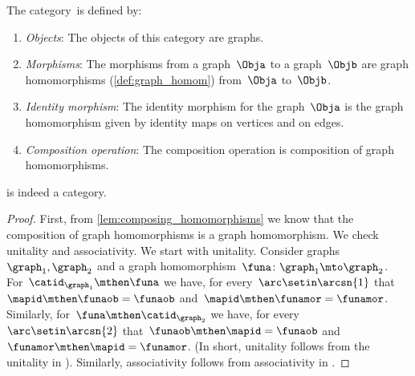 \begin{ctdefinition}
    \label{def:Grph}
    The category~\Grph is defined by:
    \begin{enumerate}
        \item \emph{Objects}: The objects of this category are graphs.
        \item \emph{Morphisms}: The morphisms from a graph~$\Obja$ to a graph~$\Objb$ are graph homomorphisms (\cref{def:graph_homom}) from~$\Obja$ to~$\Objb$.
        \item \emph{Identity morphism}: The identity morphism for the graph~$\Obja$
              is the graph homomorphism given by identity maps on vertices and on edges.
        \item \emph{Composition operation}: The composition operation is composition of graph homomorphisms.
    \end{enumerate}
\end{ctdefinition}

\begin{lemma}
    \Grph is indeed a category.
\end{lemma}

\begin{proof}
    First, from \cref{lem:composing_homomorphisms} we know that the composition of graph homomorphisms is a graph homomorphism.
    We check unitality and associativity.
    We start with unitality.
    Consider graphs~$\graph_1,\graph_2$ and a graph homomorphism~$\funa\colon \graph_1\mto \graph_2$.
    For~$\catid_{\graph_1}\mthen \funa$ we have, for every~$\arc \setin \arcsn{1}$ that~$\mapid\mthen \funaob=\funaob$ and~$\mapid\mthen \funamor=\funamor$.
    Similarly, for~$\funa \mthen \catid_{\graph_2}$ we have, for every~$\arc \setin \arcsn{2}$ that~$\funaob\mthen \mapid=\funaob$ and~$\funamor \mthen \mapid=\funamor$.
    (In short, unitality follows from the unitality in \Set).
    Similarly, associativity follows from associativity in \Set.
\end{proof}
